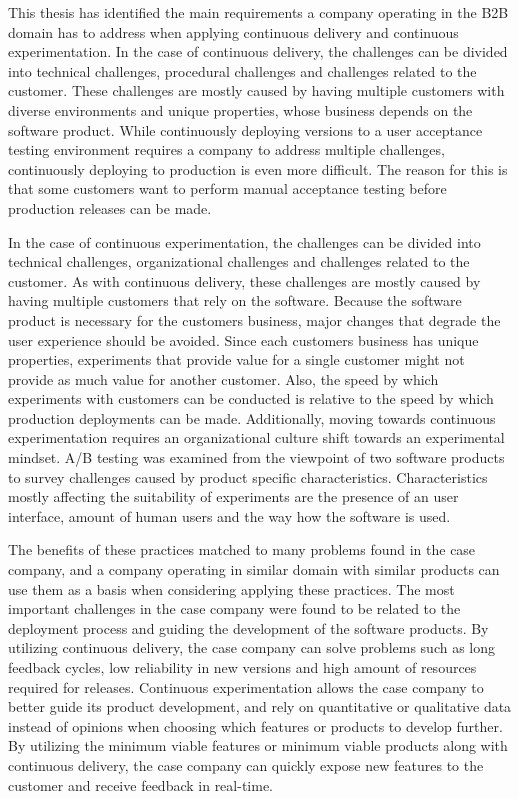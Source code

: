 \documentclass[english, grading]{tktltiki2}
\theoremstyle{definition}
\theoremstyle{remark}
\begin{document}
This thesis has identified the main requirements a company operating in the B2B domain has to address when applying continuous delivery and continuous experimentation. In the case of continuous delivery, the challenges can be divided into technical challenges, procedural challenges and challenges related to the customer. These challenges are mostly caused by having multiple customers with diverse environments and unique properties, whose business depends on the software product. While continuously deploying versions to a user acceptance testing environment requires a company to address multiple challenges, continuously deploying to production is even more difficult. The reason for this is that some customers want to perform manual acceptance testing before production releases can be made. 

In the case of continuous experimentation, the challenges can be divided into technical challenges, organizational challenges and challenges related to the customer. As with continuous delivery, these challenges are mostly caused by having multiple customers that rely on the software. Because the software product is necessary for the customers business, major changes that degrade the user experience should be avoided. Since each customers business has unique properties, experiments that provide value for a single customer might not provide as much value for another customer. Also, the speed by which experiments with customers can be conducted is relative to the speed by which production deployments can be made. Additionally, moving towards continuous experimentation requires an organizational culture shift towards an experimental mindset. A/B testing was examined from the viewpoint of two software products to survey challenges caused by product specific characteristics. Characteristics mostly affecting the suitability of experiments are the presence of an user interface, amount of human users and the way how the software is used.

The benefits of these practices matched to many problems found in the case company, and a company operating in similar domain with similar products can use them as a basis when considering applying these practices. The most important challenges in the case company were found to be related to the deployment process and guiding the development of the software products. By utilizing continuous delivery, the case company can solve problems such as long feedback cycles, low reliability in new versions and high amount of resources required for releases. Continuous experimentation allows the case company to better guide its product development, and rely on quantitative or qualitative data instead of opinions when choosing which features or products to develop further. By utilizing the minimum viable features or minimum viable products along with continuous delivery, the case company can quickly expose new features to the customer and receive feedback in real-time.
\end{document}
